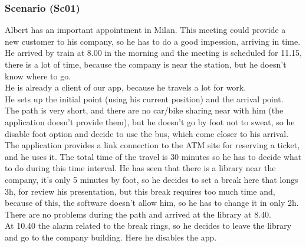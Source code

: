 \documentclass[a4paper,leqno]{book}
\begin{document}
\subsubsection{Scenario (Sc01) }
Albert has an important appointment in Milan. 
This meeting could provide a new customer to his company, so he has to do a good impession, arriving in time.\\
He arrived by train at 8.00 in the morning and the meeting is scheduled for 11.15, there is a lot of time, because 
the company is near the station, but he doesn't know where to go.\\
He is already a client of our app, because he travels a lot for work.\\
He sets up the initial point (using his current position) and the arrival point.\\
The path is very short, and there are no car/bike sharing near with him (the application doesn't provide them), but he doesn't go by foot not to sweat,
so he disable foot option and decide to use the bus, which come closer to his arrival.\\
The application provides a link connection to the ATM site for reserving a ticket, and he uses it.
The total time of the travel is 30 minutes so he has to decide what to do during this time interval.
He has seen that there is a library near the company, it's only 5 minutes by foot, so he decides to set a break here that longs 3h, for review his presentation,
but this break requires too much time and, because of this, the software doesn't allow him, so he has to change it in only 2h.
There are no problems during the path and arrived at the library at 8.40.\\
At 10.40 the alarm related to the break rings, so he decides to leave the library and go to the company building. 
Here he disables the app.
\end{document}
